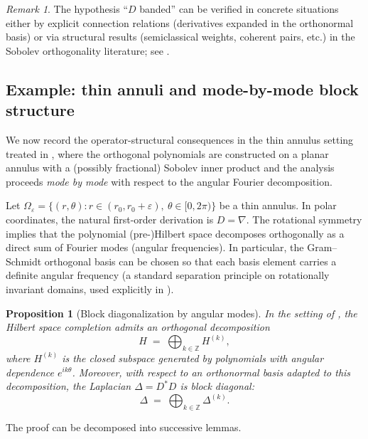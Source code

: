 \documentclass{amsart}
\numberwithin{equation}{section}
\newtheorem{proposition}[theorem]{Proposition}
\theoremstyle{definition}
\theoremstyle{remark}
\newtheorem{remark}[theorem]{Remark}
\begin{document}
\begin{remark}
The hypothesis ``$D$ banded'' can be verified in concrete situations either by explicit connection
relations (derivatives expanded in the orthonormal basis) or via structural results (semiclassical
weights, coherent pairs, etc.) in the Sobolev orthogonality literature; see \cite{MarcellanXuSurvey}.
\end{remark}

\subsection{Example: thin annuli and mode-by-mode block structure}

We now record the operator-structural consequences in the thin annulus setting treated in
\cite{MagnotThinAnnuli}, where the orthogonal polynomials are constructed on a planar annulus
with a (possibly fractional) Sobolev inner product and the analysis proceeds \emph{mode by mode}
with respect to the angular Fourier decomposition.

Let $\Omega_\varepsilon=\{(r,\theta): r\in(r_0,r_0+\varepsilon),\ \theta\in[0,2\pi)\}$ be a thin annulus.
In polar coordinates, the natural first-order derivation is $D=\nabla$.
The rotational symmetry implies that the polynomial (pre-)Hilbert space decomposes orthogonally as a direct sum
of Fourier modes (angular frequencies). In particular, the Gram--Schmidt orthogonal basis can be chosen so that
each basis element carries a definite angular frequency (a standard separation principle on rotationally
invariant domains, used explicitly in \cite{MagnotThinAnnuli}).

\begin{proposition}[Block diagonalization by angular modes]\label{prop:blockModes}
In the setting of \cite{MagnotThinAnnuli}, the Hilbert space completion admits an orthogonal decomposition
\[
H \;=\;\bigoplus_{k\in\mathbb Z} H^{(k)},
\]
where $H^{(k)}$ is the closed subspace generated by polynomials with angular dependence $e^{ik\theta}$.
Moreover, with respect to an orthonormal basis adapted to this decomposition, the Laplacian
$\Delta=D^*D$ is block diagonal:
\[
\Delta \;=\;\bigoplus_{k\in\mathbb Z} \Delta^{(k)}.
\]
\end{proposition}

The proof can be decomposed into successive lemmas.
\end{document}
